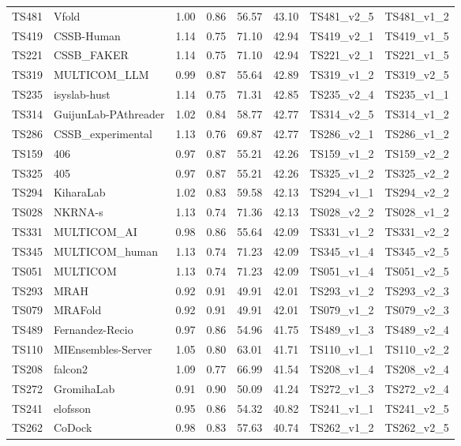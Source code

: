\begin{longtable}{llllllll}
TS481 & Vfold & 1.00 & 0.86 & 56.57 & 43.10 & TS481\_v2\_5 & TS481\_v1\_2 \\ 
TS419 & CSSB-Human & 1.14 & 0.75 & 71.10 & 42.94 & TS419\_v2\_1 & TS419\_v1\_5 \\ 
TS221 & CSSB\_FAKER & 1.14 & 0.75 & 71.10 & 42.94 & TS221\_v2\_1 & TS221\_v1\_5 \\ 
TS319 & MULTICOM\_LLM & 0.99 & 0.87 & 55.64 & 42.89 & TS319\_v1\_2 & TS319\_v2\_5 \\ 
TS235 & isyslab-hust & 1.14 & 0.75 & 71.31 & 42.85 & TS235\_v2\_4 & TS235\_v1\_1 \\ 
TS314 & GuijunLab-PAthreader & 1.02 & 0.84 & 58.77 & 42.77 & TS314\_v2\_5 & TS314\_v1\_2 \\ 
TS286 & CSSB\_experimental & 1.13 & 0.76 & 69.87 & 42.77 & TS286\_v2\_1 & TS286\_v1\_2 \\ 
TS159 & 406 & 0.97 & 0.87 & 55.21 & 42.26 & TS159\_v1\_2 & TS159\_v2\_2 \\ 
TS325 & 405 & 0.97 & 0.87 & 55.21 & 42.26 & TS325\_v1\_2 & TS325\_v2\_2 \\ 
TS294 & KiharaLab & 1.02 & 0.83 & 59.58 & 42.13 & TS294\_v1\_1 & TS294\_v2\_2 \\ 
TS028 & NKRNA-s & 1.13 & 0.74 & 71.36 & 42.13 & TS028\_v2\_2 & TS028\_v1\_2 \\ 
TS331 & MULTICOM\_AI & 0.98 & 0.86 & 55.64 & 42.09 & TS331\_v1\_2 & TS331\_v2\_2 \\ 
TS345 & MULTICOM\_human & 1.13 & 0.74 & 71.23 & 42.09 & TS345\_v1\_4 & TS345\_v2\_5 \\ 
TS051 & MULTICOM & 1.13 & 0.74 & 71.23 & 42.09 & TS051\_v1\_4 & TS051\_v2\_5 \\ 
TS293 & MRAH & 0.92 & 0.91 & 49.91 & 42.01 & TS293\_v1\_2 & TS293\_v2\_3 \\ 
TS079 & MRAFold & 0.92 & 0.91 & 49.91 & 42.01 & TS079\_v1\_2 & TS079\_v2\_3 \\ 
TS489 & Fernandez-Recio & 0.97 & 0.86 & 54.96 & 41.75 & TS489\_v1\_3 & TS489\_v2\_4 \\ 
TS110 & MIEnsembles-Server & 1.05 & 0.80 & 63.01 & 41.71 & TS110\_v1\_1 & TS110\_v2\_2 \\ 
TS208 & falcon2 & 1.09 & 0.77 & 66.99 & 41.54 & TS208\_v1\_4 & TS208\_v2\_4 \\ 
TS272 & GromihaLab & 0.91 & 0.90 & 50.09 & 41.24 & TS272\_v1\_3 & TS272\_v2\_4 \\ 
TS241 & elofsson & 0.95 & 0.86 & 54.32 & 40.82 & TS241\_v1\_1 & TS241\_v2\_5 \\ 
TS262 & CoDock & 0.98 & 0.83 & 57.63 & 40.74 & TS262\_v1\_2 & TS262\_v2\_5 \\ 

\end{longtable}
